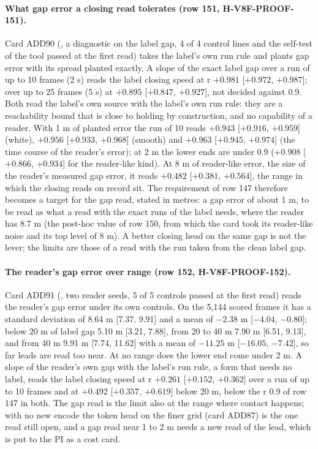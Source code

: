 \paragraph{What gap error a closing read tolerates (row 151, H-V8F-PROOF-151).} Card ADD90 (, a diagnostic on the label gap, 4 of 4 control lines and the self-test of the tool passed at the first read) takes the label's own run rule and plants gap error with its spread planted exactly. A slope of the exact label gap over a run of up to 10 frames (2 s) reads the label closing speed at r $+0.981$ [$+0.972$, $+0.987$]; over up to 25 frames (5 s) at $+0.895$ [$+0.847$, $+0.927$], not decided against 0.9. Both read the label's own source with the label's own run rule: they are a reachability bound that is close to holding by construction, and no capability of a reader. With 1 m of planted error the run of 10 reads $+0.943$ [$+0.916$, $+0.959$] (white), $+0.956$ [$+0.933$, $+0.968$] (smooth) and $+0.963$ [$+0.945$, $+0.974$] (the time course of the reader's error); at 2 m the lower ends are under 0.9 ($+0.908$ [$+0.866$, $+0.934$] for the reader-like kind). At 8 m of reader-like error, the size of the reader's measured gap error, it reads $+0.482$ [$+0.381$, $+0.564$], the range in which the closing reads on record sit. The requirement of row 147 therefore becomes a target for the gap read, stated in metres: a gap error of about 1 m, to be read as what a read with the exact runs of the label needs, where the reader has 8.7 m (the post-hoc value of row 150, from which the card took its reader-like noise and its top level of 8 m). A better closing head on the same gap is not the lever; the limits are those of a  read with the run taken from the clean label gap.

\paragraph{The reader's gap error over range (row 152, H-V8F-PROOF-152).} Card ADD91 (, two reader seeds, 5 of 5 controls passed at the first read) reads the reader's gap error under its own controls. On the 5,144 scored frames it has a standard deviation of 8.64 m [7.37, 9.91] and a mean of $-2.38$ m [$-4.04$, $-0.80$]; below 20 m of label gap 5.10 m [3.21, 7.88], from 20 to 40 m 7.90 m [6.51, 9.13], and from 40 m 9.91 m [7.74, 11.62] with a mean of $-11.25$ m [$-16.05$, $-7.42$], so far leads are read too near. At no range does the lower end come under 2 m. A slope of the reader's own gap with the label's run rule, a form that needs no label, reads the label closing speed at r $+0.261$ [$+0.152$, $+0.362$] over a run of up to 10 frames and at $+0.492$ [$+0.357$, $+0.619$] below 20 m, below the r 0.9 of row 147 in both. The gap read is the limit also at the range where contact happens; with no new encode the token head on the finer grid (card ADD87) is the one read still open, and a gap read near 1 to 2 m needs a new read of the lead, which is put to the PI as a cost card.

